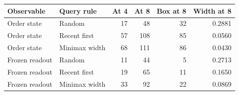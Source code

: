 \begin{tabular}{llrrrr}\toprule
Observable & Query rule & At 4 & At 8 & Box at 8 & Width at 8 \\\midrule
Order state & Random & 17 & 48 & 32 & 0.2881 \\
Order state & Recent first & 57 & 108 & 85 & 0.0560 \\
Order state & Minimax width & 68 & 111 & 86 & 0.0430 \\
Frozen readout & Random & 11 & 44 & 5 & 0.2713 \\
Frozen readout & Recent first & 19 & 65 & 11 & 0.1650 \\
Frozen readout & Minimax width & 33 & 92 & 22 & 0.0869 \\
\bottomrule\end{tabular}
